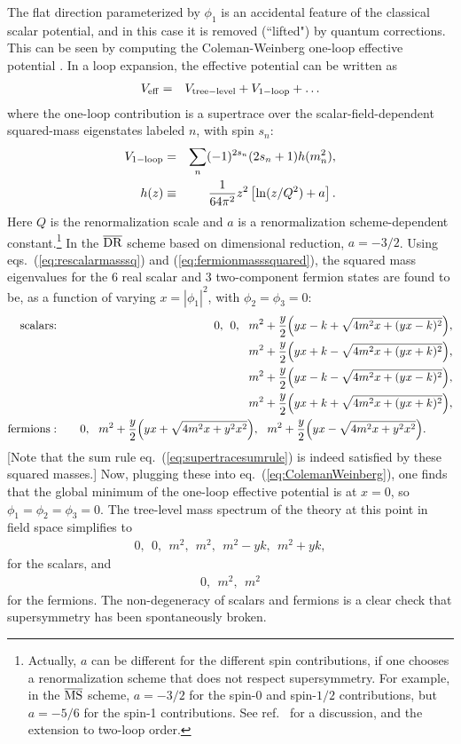 \documentclass[11pt]{article}
\def\beq{\begin{eqnarray}}
\def\eeq{\end{eqnarray}}
\def\drbar{\overline{\rm DR}}
\def\msbar{\overline{\rm MS}}
\begin{document}
The flat direction parameterized by $\phi_1$ is an accidental feature of
the classical scalar potential, and in this case it is removed (``lifted")
by quantum corrections. This can be seen by computing the Coleman-Weinberg
one-loop effective potential \cite{ColemanWeinberg}. In a loop expansion,
the effective potential can be written as
\beq
V_{\rm eff} &=& V_{\rm tree-level} + V_{\rm 1-loop} + \ldots
\label{eq:Veffexp}
\eeq
where the one-loop contribution is a supertrace over the
scalar-field-dependent squared-mass eigenstates labeled $n$, with spin $s_n$:
\beq
V_{\rm 1-loop} &=& \sum_n (-1)^{2 s_n} (2 s_n + 1) h(m_n^2),
\\
h(z) &\equiv& \frac{1}{64 \pi^2} z^2 \left [\ln(z/Q^2) + a \right].
\label{eq:ColemanWeinberg}
\eeq
Here $Q$ is the renormalization scale and 
$a$ is a renormalization scheme-dependent constant.\footnote{Actually, $a$ can be 
different for the different spin contributions, if one chooses a renormalization 
scheme that does not respect 
supersymmetry. For example, in 
the $\msbar$ scheme, $a = -3/2$ for the spin-0 and spin-$1/2$ contributions, 
but $a = -5/6$ for 
the spin-1 contributions. See ref.~\cite{twoloopEP} 
for a discussion, and the extension to two-loop order.}  
In the $\drbar$ scheme based on dimensional reduction, $a=-3/2$.
Using eqs.~(\ref{eq:rescalarmasssq}) and
(\ref{eq:fermionmasssquared}), the squared mass eigenvalues for the 6 real scalar and 
3 two-component fermion 
states are found to be, as a function of varying $x = |\phi_1|^2$, with $\phi_2=\phi_3=0$:
\beq
\mbox{scalars:}
\quad&&
0
,\>\>
0
,\>\>\> 
m^2 + \frac{y}{2} \Bigl (y x - k + \sqrt{4 m^2 x + (y x - k)^2} \Bigr ),
\nonumber
\\
&& m^2 + \frac{y}{2} \Bigl (y x + k - \sqrt{4 m^2 x + (y x + k)^2} \Bigr ),
\nonumber
\\
&& m^2 + \frac{y}{2} \Bigl (y x - k - \sqrt{4 m^2 x + (y x - k)^2} \Bigr ),
\nonumber
\\ 
&&
m^2 + \frac{y}{2} \Bigl (y x + k + \sqrt{4 m^2 x + (y x + k)^2} \Bigr ),
\\
\mbox{fermions}:\quad&&
0
,\>\>\>
m^2 + \frac{y}{2} \Bigl (y x + \sqrt{4 m^2 x + y^2 x^2} \Bigr )
,\>\>\>
m^2 + \frac{y}{2} \Bigl (y x - \sqrt{4 m^2 x + y^2 x^2} \Bigr ).\phantom{xxxx}
\eeq
[Note that the sum rule
eq.~(\ref{eq:supertracesumrule}) is indeed satisfied by these squared
masses.] 
Now, plugging these into eq.~(\ref{eq:ColemanWeinberg}), one finds that the global minimum of the 
one-loop 
effective potential is at $x=0$, so $\phi_1 = \phi_2 = \phi_3 = 0$. 
The tree-level mass
spectrum of the theory at this point in field space simplifies to
\beq
0,\>\> 0,\>\> m^2,\>\> m^2,\>\> m^2 - yk,\>\> m^2 + yk ,
\label{ORscalars}
\eeq
for the scalars, and
\beq
0,\>\> m^2,\>\> m^2
\label{ORfermions}
\eeq
for the fermions.
The non-degeneracy of scalars and fermions is a clear check that
supersymmetry has been spontaneously broken. 
\end{document}
